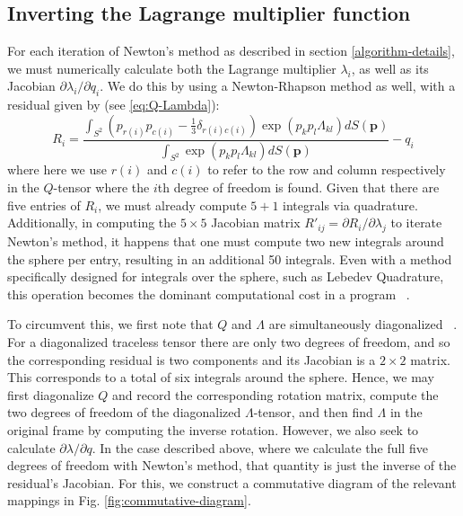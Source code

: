 \documentclass[reqno]{article}
\begin{document}
  \subsection{Inverting the Lagrange multiplier function}
  For each iteration of Newton's method as described in section
  \ref{algorithm-details}, we must numerically calculate both the Lagrange multiplier
  $\lambda_i$, as well as its Jacobian $\partial \lambda_i/ \partial q_i$.
  We do this by using a Newton-Rhapson method as well, with a residual given by (see
  \eqref{eq:Q-Lambda}):
  \begin{equation}
    R_i
    =
    \frac{\int_{S^2} (p_{r(i)} p_{c(i)} - \tfrac13 \delta_{r(i) c(i)}) \exp(p_k p_l \Lambda_{kl}) dS(\mathbf{p})}
    {\int_{S^2} \exp(p_k p_l \Lambda_{kl}) dS(\mathbf{p})} - q_i
  \end{equation}
  where here we use $r(i)$ and $c(i)$ to refer to the row and column respectively in the
  $Q$-tensor where the $i$th degree of freedom is found.
  Given that there are five entries of $R_i$, we must already compute $5 + 1$
  integrals via quadrature.
  Additionally, in computing the $5\times 5$ Jacobian matrix
  $R'_{ij} = \partial R_i / \partial \lambda_j$ to iterate Newton's method, it
  happens that one must compute two new integrals around the sphere per entry,
  resulting in an additional 50 integrals.
  Even with a method specifically designed for integrals over the sphere, such
  as Lebedev Quadrature, this operation becomes the dominant computational cost
  in a program ~\cite{burkhardt_lebedev_quadrature, LEBEDEV197610}.
  
  To circumvent this, we first note that $Q$ and $\Lambda$ are simultaneously
  diagonalized ~\cite{schimming_numerical_2021}.
  For a diagonalized traceless tensor there are only two degrees of
  freedom, and so the corresponding residual is two components and its Jacobian
  is a $2\times 2$ matrix.
  This corresponds to a total of six integrals around the sphere.
  Hence, we may first diagonalize $Q$ and record the corresponding rotation
  matrix, compute the two degrees of freedom of the diagonalized
  $\Lambda$-tensor, and then find $\Lambda$ in the original frame by computing
  the inverse rotation.
  However, we also seek to calculate $\partial \lambda/\partial q$.
  In the case described above, where we calculate the full five degrees of
  freedom with Newton's method, that quantity is just the inverse of the
  residual's Jacobian.
  For this, we construct a commutative diagram of the relevant mappings in Fig.
  \ref{fig:commutative-diagram}.
\end{document}
